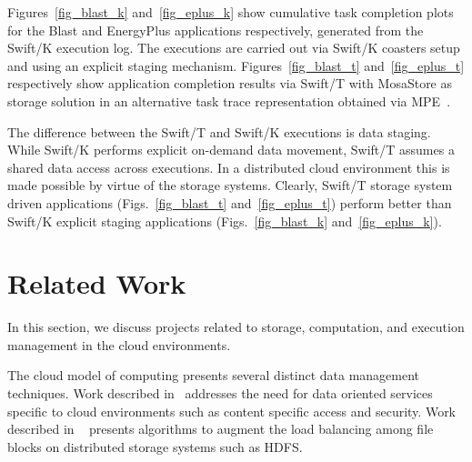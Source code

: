 \documentclass{sig-alternate}
\begin{document}
Figures~\ref{fig_blast_k} and~\ref{fig_eplus_k} show cumulative task completion
plots for the Blast and EnergyPlus applications respectively, generated from
the Swift/K execution log. The executions are carried out via Swift/K coasters
setup and using an explicit staging mechanism. Figures~\ref{fig_blast_t}
and~\ref{fig_eplus_t} respectively show application completion results via
Swift/T with MosaStore as storage solution in an alternative task trace
representation obtained via MPE~\cite{mpe}.

The difference between the Swift/T and Swift/K executions is data staging. While
Swift/K performs explicit on-demand data movement, Swift/T assumes a shared
data access across executions. In a distributed cloud environment this is made
possible by virtue of the storage systems. Clearly, Swift/T storage system
driven applications (Figs.~\ref{fig_blast_t} and~\ref{fig_eplus_t}) perform
better than Swift/K explicit staging applications
(Figs.~\ref{fig_blast_k} and~\ref{fig_eplus_k}).

\section{Related Work} \label{sec:related}
In this section, we discuss projects related to storage, computation, and
execution management in the cloud environments. 
%
%
%
%    
%
%

The cloud model of computing presents several distinct data management
techniques. Work described in~\cite{cloud-dataintensive} addresses the need
for data oriented services specific to cloud environments such as content
specific access and security. Work described in ~\cite{rebalance} presents
algorithms to augment the load balancing among file blocks on distributed
storage systems such as HDFS.
\end{document}
